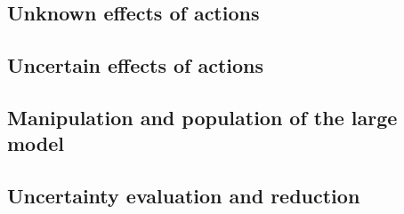 \subsection{Unknown effects of actions}


\subsection{Uncertain effects of actions}

\subsection{Manipulation and population of the large model}

\subsection{Uncertainty evaluation and reduction}
